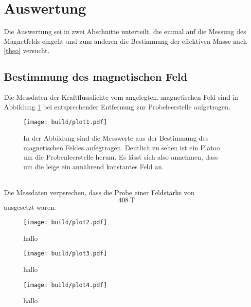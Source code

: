 \newpage
\section{Auswertung}
Die Auswertung sei in zwei Abschnitte unterteilt, die einmal auf die Messung des Magnetfelds eingeht und zum 
anderen die Bestimmung der effektiven Masse nach \ref{theo} versucht. 
\subsection{Bestimmung des magnetischen Feld}
Die Messdaten der Kraftflussdichte vom angelegten, magnetischen Feld sind in Abbildung \ref{fig:mag}
bei entsprechender Entfernung zur Probeleerstelle aufgetragen.
\begin{figure}
    \centering
    \texttt{[image: build/plot1.pdf]}
    \caption{In der Abbildung sind die Messwerte aus der Bestimmung des magnetischen Feldes aufegtragen. 
            Deutlich zu sehen ist ein Platoo um die Probenleerstelle herum. Es lässt sich also annehmen, dass
            um die leige ein annährend konstantes Feld an.}
    \label{fig:mag}
\end{figure}
\\
Die Messdaten verpsrechen, dass die Probe einer Feldstärke von 
\begin{equation}
    \SI{408}{\tesla}
\end{equation}
ausgesetzt waren.
\begin{figure}
    \centering
    \texttt{[image: build/plot2.pdf]}
    \caption{hallo}
\end{figure}

\begin{figure}
    \centering
    \texttt{[image: build/plot3.pdf]}
    \caption{hallo}
\end{figure}

\begin{figure}
    \centering
    \texttt{[image: build/plot4.pdf]}
    \caption{hallo}
\end{figure}